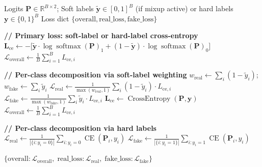 \documentclass[12pt]{article}
\begin{document}
\clearpage
\begin{algorithm}[p]
\caption{Loss Computation}
\label{alg:loss}
\begin{algorithmic}[1]
\Require
  Logits $\mathbf{P} \in \mathbb{R}^{B \times 2}$;
  Soft labels $\tilde{\mathbf{y}} \in [0,1]^{B}$ (if mixup active) or hard labels $\mathbf{y} \in \{0,1\}^{B}$
\Ensure
  Loss dict $\{\text{overall}, \text{real\_loss}, \text{fake\_loss}\}$

\State \textbf{// Primary loss: soft-label or hard-label cross-entropy}
  \State $\mathbf{L}_{\text{ce}} \gets -\big[\tilde{\mathbf{y}} \cdot \log\operatorname{softmax}(\mathbf{P})_1 + (1 - \tilde{\mathbf{y}}) \cdot \log\operatorname{softmax}(\mathbf{P})_0\big]$
  \State $\mathcal{L}_{\text{overall}} \gets \frac{1}{B}\sum_{i=1}^{B} L_{\text{ce},i}$

  \State \textbf{// Per-class decomposition via soft-label weighting}
  \State $w_{\text{real}} \gets \sum_i (1 - \tilde{y}_i)$; \quad
        $w_{\text{fake}} \gets \sum_i \tilde{y}_i$
  \State $\mathcal{L}_{\text{real}} \gets \frac{1}{\max(w_{\text{real}}, 1)} \sum_i (1 - \tilde{y}_i) \cdot L_{\text{ce},i}$
  \State $\mathcal{L}_{\text{fake}} \gets \frac{1}{\max(w_{\text{fake}}, 1)} \sum_i \tilde{y}_i \cdot L_{\text{ce},i}$
\Else
  \State $\mathbf{L}_{\text{ce}} \gets \operatorname{CrossEntropy}(\mathbf{P}, \mathbf{y})$
  \State $\mathcal{L}_{\text{overall}} \gets \frac{1}{B}\sum_{i=1}^{B} L_{\text{ce},i}$

  \State \textbf{// Per-class decomposition via hard labels}
  \State $\mathcal{L}_{\text{real}} \gets \frac{1}{|\{i:y_i=0\}|} \sum_{i: y_i=0} \operatorname{CE}(\mathbf{P}_i, y_i)$
  \State $\mathcal{L}_{\text{fake}} \gets \frac{1}{|\{i:y_i=1\}|} \sum_{i: y_i=1} \operatorname{CE}(\mathbf{P}_i, y_i)$
\EndIf

\State \Return $\{\text{overall}: \mathcal{L}_{\text{overall}},\;
                  \text{real\_loss}: \mathcal{L}_{\text{real}},\;
                  \text{fake\_loss}: \mathcal{L}_{\text{fake}}\}$
\end{algorithmic}
\end{algorithm}
\end{document}
